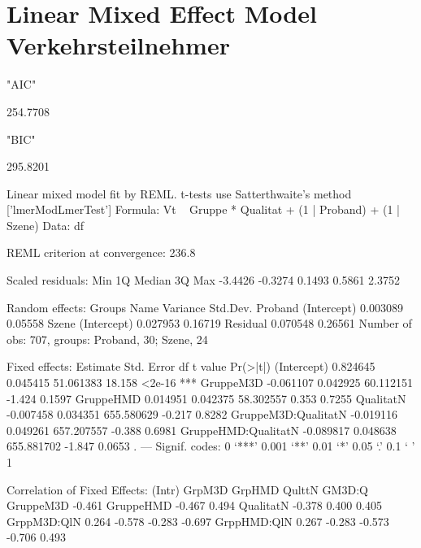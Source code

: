 \documentclass{article}
\begin{document}


\section{Linear Mixed Effect Model Verkehrsteilnehmer}%
\footnotesize{
\begin{Schunk}
\begin{Soutput}
[1] "AIC"
\end{Soutput}
\begin{Soutput}
[1] 254.7708
\end{Soutput}
\begin{Soutput}
[1] "BIC"
\end{Soutput}
\begin{Soutput}
[1] 295.8201
\end{Soutput}
\begin{Soutput}
Linear mixed model fit by REML. t-tests use Satterthwaite's method ['lmerModLmerTest']
Formula: Vt ~ Gruppe * Qualitat + (1 | Proband) + (1 | Szene)
   Data: df

REML criterion at convergence: 236.8

Scaled residuals: 
    Min      1Q  Median      3Q     Max 
-3.4426 -0.3274  0.1493  0.5861  2.3752 

Random effects:
 Groups   Name        Variance Std.Dev.
 Proband  (Intercept) 0.003089 0.05558 
 Szene    (Intercept) 0.027953 0.16719 
 Residual             0.070548 0.26561 
Number of obs: 707, groups:  Proband, 30; Szene, 24

Fixed effects:
                      Estimate Std. Error         df t value Pr(>|t|)    
(Intercept)           0.824645   0.045415  51.061383  18.158   <2e-16 ***
GruppeM3D            -0.061107   0.042925  60.112151  -1.424   0.1597    
GruppeHMD             0.014951   0.042375  58.302557   0.353   0.7255    
QualitatN            -0.007458   0.034351 655.580629  -0.217   0.8282    
GruppeM3D:QualitatN  -0.019116   0.049261 657.207557  -0.388   0.6981    
GruppeHMD:QualitatN  -0.089817   0.048638 655.881702  -1.847   0.0653 .  
---
Signif. codes:  0 ‘***’ 0.001 ‘**’ 0.01 ‘*’ 0.05 ‘.’ 0.1 ‘ ’ 1

Correlation of Fixed Effects:
            (Intr) GrpM3D GrpHMD QulttN GM3D:Q
GruppeM3D   -0.461                            
GruppeHMD   -0.467  0.494                     
QualitatN   -0.378  0.400  0.405              
GrppM3D:QlN  0.264 -0.578 -0.283 -0.697       
GrppHMD:QlN  0.267 -0.283 -0.573 -0.706  0.493
\end{Soutput}
\end{Schunk}
}
\end{document}
